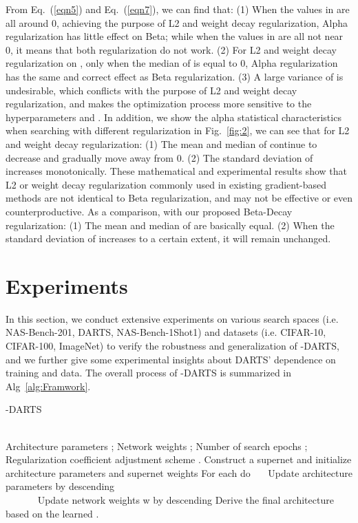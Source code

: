 \documentclass[10pt,twocolumn,letterpaper]{article}
\begin{document}
From Eq.~(\ref{eqn5}) and Eq.~(\ref{eqn7}), we can find that: (1) When the values in  are all around 0, achieving the purpose of L2 and weight decay regularization, Alpha regularization has little effect on Beta; while when the values in  are all not near 0, it means that both regularization do not work. (2) For L2 and weight decay regularization on , only when the median of  is equal to 0, Alpha regularization has the same and correct effect as Beta regularization. (3) A large variance of  is undesirable, which conflicts with the purpose of L2 and weight decay regularization, and makes the optimization process more sensitive to the hyperparameters  and . In addition, we show the alpha statistical characteristics when searching with different regularization in Fig.~\ref{fig:2}, we can see that for L2 and weight decay regularization: (1) The mean and median of  continue to decrease and gradually move away from 0. (2) The standard deviation of  increases monotonically. These mathematical and experimental results show that L2 or weight decay regularization commonly used in existing gradient-based methods are not identical to Beta regularization, and may not be effective or even counterproductive. As a comparison, with our proposed Beta-Decay regularization: (1) The mean and median of  are basically equal. (2) When the standard deviation of  increases to a certain extent, it will remain unchanged. 

\section{Experiments} \label{sec:Exp}
In this section, we conduct extensive experiments on various search spaces (i.e. NAS-Bench-201, DARTS, NAS-Bench-1Shot1) and datasets (i.e. CIFAR-10, CIFAR-100, ImageNet) to verify the robustness and generalization of -DARTS, and we further give some experimental insights about DARTS' dependence on training and data. The overall process of -DARTS is summarized in Alg~\ref{alg:Framwork}. 
\begin{algorithm}[htb]
\caption{-DARTS}   
\label{alg:Framwork}   
\begin{algorithmic}[1] \REQUIRE ~~\\ Architecture parameters ; Network weights ; Number of search epochs ; Regularization coefficient adjustment scheme .
\STATE Construct a supernet and initialize architecture parameters  and supernet weights 
\label{ code:fram:extract }\STATE For each  do   
\STATE ~~~Update architecture parameters  by descending \\ 
       ~~~
\STATE ~~~Update network weights w by descending 
\STATE Derive the final architecture based on the learned .
\end{algorithmic} 
\end{algorithm} 
\end{document}
